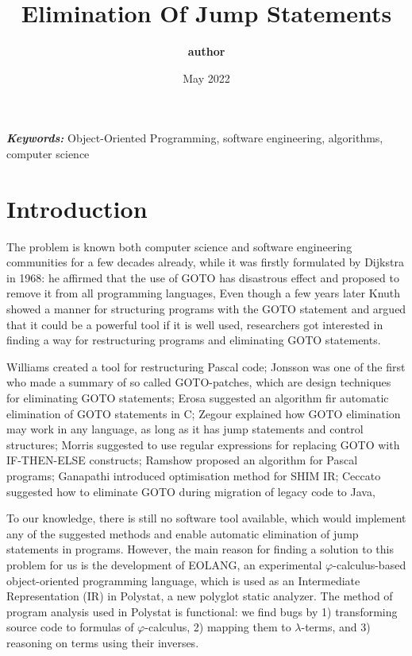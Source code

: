 \documentclass[two column]{article}
\title{\textbf{Elimination Of Jump Statements}}
\author{\textbf{author}}
\date{May 2022}
\providecommand{\keywords}[1]
{
  \small
  \textbf{\textit{Keywords:}} #1
}
\begin{document}
\maketitle








\keywords{Object-Oriented Programming, software engineering, algorithms, computer science}


\section{Introduction}
The problem is known both computer science and software engineering communities for a few decades already, while it was firstly formulated by Dijkstra in 1968: he affirmed that the use of GOTO has disastrous effect and proposed to remove it from all programming languages,
Even though a few years later Knuth showed a manner for structuring programs with the GOTO statement and argued that it could be a powerful tool if it is well used, researchers got interested in finding a way for restructuring programs and eliminating GOTO statements.

Williams created a tool for restructuring Pascal code; Jonsson was one of the first who made a summary of so called GOTO-patches, which are design techniques for eliminating GOTO statements;
Erosa suggested an algorithm fir automatic elimination of GOTO statements in C;
Zegour explained how GOTO elimination may work in any language, as long as it has jump statements and control structures; Morris suggested to use regular expressions for replacing GOTO with IF-THEN-ELSE constructs;
Ramshow proposed an algorithm for Pascal programs; Ganapathi introduced optimisation method for SHIM IR; Ceccato suggested how to eliminate GOTO during migration of legacy code to Java,

To our knowledge, there is still no software tool available, which would implement any of the suggested methods and enable automatic elimination of jump statements in programs.
However, the main reason for finding a solution to this problem for us is the development of EOLANG, an experimental $\varphi$-calculus-based object-oriented programming language, which is used as an Intermediate Representation (IR) in Polystat, a new polyglot static analyzer.
The method of program analysis used in Polystat is functional: we find bugs by 1) transforming source code to formulas of $\varphi$-calculus, 2) mapping them to $\lambda$-terms, and 3) reasoning on terms using their inverses.
\end{document}
